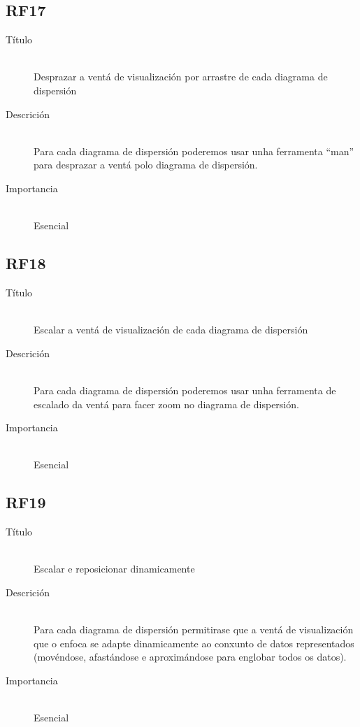 \subsection*{RF17}
\begin{description}
\item[Título] \hfill \\
Desprazar a ventá de visualización por arrastre de cada diagrama de dispersión
\item[Descrición] \hfill \\
Para cada diagrama de dispersión poderemos usar unha ferramenta ``man'' para desprazar a ventá polo diagrama de dispersión.
\item[Importancia] \hfill \\
Esencial
\end{description}

\subsection*{RF18}
\begin{description}
\item[Título] \hfill \\
Escalar a ventá de visualización de cada diagrama de dispersión
\item[Descrición] \hfill \\
Para cada diagrama de dispersión poderemos usar unha ferramenta de escalado da ventá para facer zoom no diagrama de dispersión.
\item[Importancia] \hfill \\
Esencial
\end{description}

\subsection*{RF19}
\begin{description}
\item[Título] \hfill \\
Escalar e reposicionar dinamicamente
\item[Descrición] \hfill \\
Para cada diagrama de dispersión permitirase que a ventá de visualización que o enfoca se adapte dinamicamente ao conxunto de datos representados (movéndose, afastándose e aproximándose para englobar todos os datos).
\item[Importancia] \hfill \\
Esencial
\end{description}

